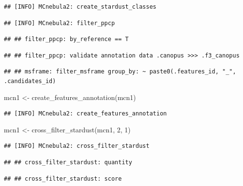 \documentclass[
]{article}
\newenvironment{Shaded}{\begin{snugshade}}{\end{snugshade}}
\newcommand{\DecValTok}[1]{\textcolor[rgb]{0.00,0.00,0.81}{#1}}
\newcommand{\FunctionTok}[1]{\textcolor[rgb]{0.00,0.00,0.00}{#1}}
\newcommand{\NormalTok}[1]{#1}
\newcommand{\OtherTok}[1]{\textcolor[rgb]{0.56,0.35,0.01}{#1}}
\begin{document}
\begin{verbatim}
## [INFO] MCnebula2: create_stardust_classes
\end{verbatim}

\begin{verbatim}
## [INFO] MCnebula2: filter_ppcp
\end{verbatim}

\begin{verbatim}
## ## filter_ppcp: by_reference == T
\end{verbatim}

\begin{verbatim}
## ## filter_ppcp: validate annotation data .canopus >>> .f3_canopus
\end{verbatim}

\begin{verbatim}
## ## msframe: filter_msframe group_by: ~ paste0(.features_id, "_", .candidates_id)
\end{verbatim}

\begin{Shaded}
\begin{Highlighting}[]
\NormalTok{mcn1 }\OtherTok{\textless{}{-}} \FunctionTok{create\_features\_annotation}\NormalTok{(mcn1)}
\end{Highlighting}
\end{Shaded}

\begin{verbatim}
## [INFO] MCnebula2: create_features_annotation
\end{verbatim}

\begin{Shaded}
\begin{Highlighting}[]
\NormalTok{mcn1 }\OtherTok{\textless{}{-}} \FunctionTok{cross\_filter\_stardust}\NormalTok{(mcn1, }\DecValTok{2}\NormalTok{, }\DecValTok{1}\NormalTok{)}
\end{Highlighting}
\end{Shaded}

\begin{verbatim}
## [INFO] MCnebula2: cross_filter_stardust
\end{verbatim}

\begin{verbatim}
## ## cross_filter_stardust: quantity
\end{verbatim}

\begin{verbatim}
## ## cross_filter_stardust: score
\end{verbatim}
\end{document}
